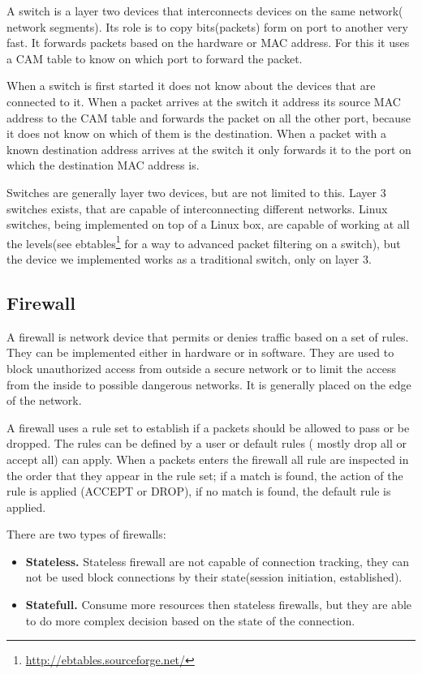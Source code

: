 A switch is a layer two devices that interconnects devices on the same network( network segments). Its role is 
to copy bits(packets) form on port to another very fast. It forwards packets based on the hardware or MAC address. 
For this it uses a CAM table to know on which port to forward the packet. 

When a switch is first started it does not know about the devices that are connected to it. When a packet arrives
at the switch it address its source MAC address to the CAM table and forwards the packet on all the other port, because
it does not know on which of them is the destination. When a packet with a known destination address arrives at the
switch it only forwards it to the port on which the destination MAC address is.

Switches are generally layer two devices, but are not limited to this. Layer 3 switches exists, that are capable of 
interconnecting different networks. Linux switches, being implemented on top of a Linux box, are capable of working
at all the levels(see ebtables\footnote{\url{http://ebtables.sourceforge.net/}} for a way to advanced packet filtering
on a switch), but the device we implemented works as a traditional switch, only on layer 3.

\subsection{Firewall}
\label{sub-sec:firewall}

A firewall is network device that permits or denies traffic based on a set of rules. They can be implemented either in
hardware or in software. They are used to block unauthorized access from outside a secure network or to limit the access
from the inside to possible dangerous networks. It is generally placed on the edge of the network.

A firewall uses a rule set to establish if a packets should be allowed to pass or be dropped. The rules can be defined
by a user or default rules ( mostly drop all or accept all) can apply. When a packets enters the firewall all rule
are inspected in the order that they appear in the rule set; if a match is found, the action of the rule is applied
(ACCEPT or DROP), if no match is found, the default rule is applied.

There are two types of firewalls:
\begin{itemize}
  \item \textbf{Stateless.} Stateless firewall are not capable of connection tracking, they can not be used block
connections by their state(session initiation, established). 
  \item \textbf{Statefull.} Consume more resources then stateless firewalls, but they are able to do more complex 
decision based on the state of the connection.
\end{itemize} 

